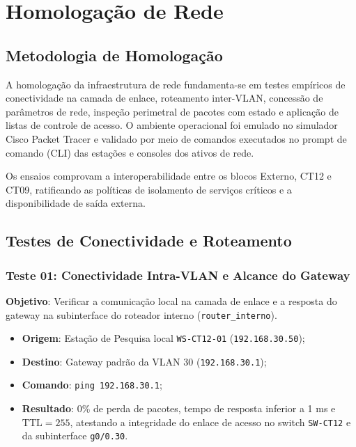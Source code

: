 
\chapter{Homologação de Rede}
\label{cap:mecanismos_avaliacao}

\section{Metodologia de Homologação}

A homologação da infraestrutura de rede fundamenta-se em testes empíricos de conectividade na camada de enlace, roteamento inter-VLAN, concessão de parâmetros de rede, inspeção perimetral de pacotes com estado e aplicação de listas de controle de acesso. O ambiente operacional foi emulado no simulador Cisco Packet Tracer e validado por meio de comandos executados no prompt de comando (CLI) das estações e consoles dos ativos de rede.

Os ensaios comprovam a interoperabilidade entre os blocos Externo, CT12 e CT09, ratificando as políticas de isolamento de serviços críticos e a disponibilidade de saída externa.

\section{Testes de Conectividade e Roteamento}

\subsection{Teste 01: Conectividade Intra-VLAN e Alcance do Gateway}
\textbf{Objetivo}: Verificar a comunicação local na camada de enlace e a resposta do gateway na subinterface do roteador interno (\texttt{router\_interno}).
\begin{itemize}
    \item \textbf{Origem}: Estação de Pesquisa local \texttt{WS-CT12-01} (\texttt{192.168.30.50});
    \item \textbf{Destino}: Gateway padrão da VLAN 30 (\texttt{192.168.30.1});
    \item \textbf{Comando}: \texttt{ping 192.168.30.1};
    \item \textbf{Resultado}: 0\% de perda de pacotes, tempo de resposta inferior a 1 ms e $\text{TTL} = 255$, atestando a integridade do enlace de acesso no switch \texttt{SW-CT12} e da subinterface \texttt{g0/0.30}.
\end{itemize}


